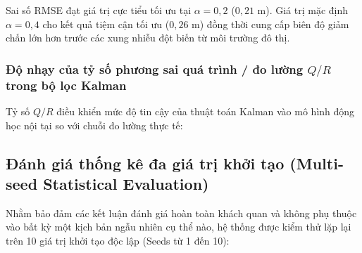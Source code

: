 Sai số RMSE đạt giá trị cực tiểu tối ưu tại $\alpha = 0{,}2$ ($0{,}21$ m). Giá trị mặc định $\alpha = 0{,}4$ cho kết quả tiệm cận tối ưu ($0{,}26$ m) đồng thời cung cấp biên độ giảm chấn lớn hơn trước các xung nhiễu đột biến từ môi trường đô thị.

\subsubsection{Độ nhạy của tỷ số phương sai quá trình / đo lường \texorpdfstring{$Q/R$}{Q/R} trong bộ lọc Kalman}

\hspace{0.5cm} Tỷ số $Q/R$ điều khiển mức độ tin cậy của thuật toán Kalman vào mô hình động học nội tại so với chuỗi đo lường thực tế:

\begin{table}[H]
\centering
\caption{Đo đạc độ nhạy sai số RMSE Kalman theo tỷ số phương sai $Q/R$ (Người đi bộ, giá trị khởi tạo 42)}
\label{tab:qr-sens}
\end{table}

\subsection{Đánh giá thống kê đa giá trị khởi tạo (Multi-seed Statistical Evaluation)}

\hspace{0.5cm} Nhằm bảo đảm các kết luận đánh giá hoàn toàn khách quan và không phụ thuộc vào bất kỳ một kịch bản ngẫu nhiên cụ thể nào, hệ thống được kiểm thử lặp lại trên 10 giá trị khởi tạo độc lập (Seeds từ 1 đến 10):


